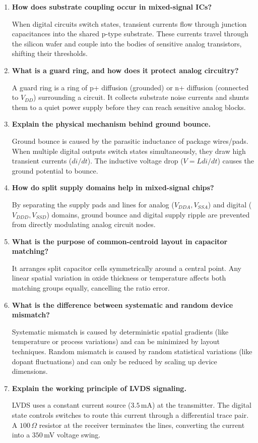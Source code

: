 \documentclass[12pt,a4paper]{article}
\newcommand{\Q}[1]{\textbf{#1}\par\noindent\ignorespaces}
\begin{document}
\begin{tcolorbox}[exambox, title={\textbf{Frequently Asked / Viva Questions}}]
\begin{enumerate}[topsep=0pt, label=\textbf{Q\arabic*.}, itemsep=5pt]
  \item \Q{How does substrate coupling occur in mixed-signal ICs?}
    When digital circuits switch states, transient currents flow through junction capacitances into the shared p-type substrate. These currents travel through the silicon wafer and couple into the bodies of sensitive analog transistors, shifting their thresholds.
  \item \Q{What is a guard ring, and how does it protect analog circuitry?}
    A guard ring is a ring of p+ diffusion (grounded) or n+ diffusion (connected to $V_{DD}$) surrounding a circuit. It collects substrate noise currents and shunts them to a quiet power supply before they can reach sensitive analog blocks.
  \item \Q{Explain the physical mechanism behind ground bounce.}
    Ground bounce is caused by the parasitic inductance of package wires/pads. When multiple digital outputs switch states simultaneously, they draw high transient currents ($di/dt$). The inductive voltage drop ($V = L di/dt$) causes the ground potential to bounce.
  \item \Q{How do split supply domains help in mixed-signal chips?}
    By separating the supply pads and lines for analog ($V_{DDA}, V_{SSA}$) and digital ($V_{DDD}, V_{SSD}$) domains, ground bounce and digital supply ripple are prevented from directly modulating analog circuit nodes.
  \item \Q{What is the purpose of common-centroid layout in capacitor matching?}
    It arranges split capacitor cells symmetrically around a central point. Any linear spatial variation in oxide thickness or temperature affects both matching groups equally, cancelling the ratio error.
  \item \Q{What is the difference between systematic and random device mismatch?}
    Systematic mismatch is caused by deterministic spatial gradients (like temperature or process variations) and can be minimized by layout techniques. Random mismatch is caused by random statistical variations (like dopant fluctuations) and can only be reduced by scaling up device dimensions.
  \item \Q{Explain the working principle of LVDS signaling.}
    LVDS uses a constant current source ($3.5\,$mA) at the transmitter. The digital state controls switches to route this current through a differential trace pair. A $100\,\Omega$ resistor at the receiver terminates the lines, converting the current into a $350\,$mV voltage swing.

\end{enumerate}
\end{tcolorbox}
\end{document}
